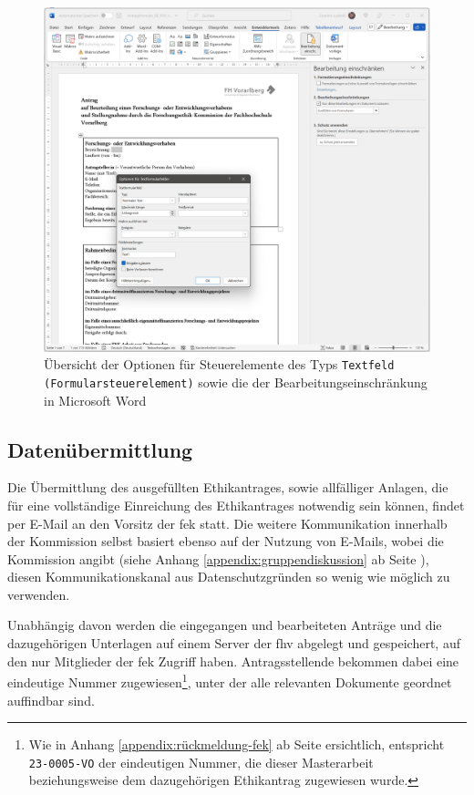 \documentclass[a4paper,12pt,twoside]{scrreprt}
\begin{document}
\begin{figure}[ht]
    \centering
    \includegraphics[width=\linewidth]{thesis/images/Luidold_Word-Vorlage-FHV-Textformularfeld.png}
    \caption{Übersicht der Optionen für Steuerelemente des Typs \texttt{Textfeld (Formularsteuerelement)} sowie die der Bearbeitungseinschränkung in Microsoft Word}
    \label{fig:optionen-textformularfeld-bearbeitungsmöglichkeiten}
\end{figure}

\subsection{Datenübermittlung}
\label{sub-sec:datenübermittlung}

Die Übermittlung des ausgefüllten Ethikantrages, sowie allfälliger Anlagen, die für eine vollständige Einreichung des Ethikantrages notwendig sein können, findet per E-Mail an den Vorsitz der \ac{fek} statt. \cite{fachhochschule_vorarlberg_gmbh_forschungsethik-kommission_2021} Die weitere Kommunikation innerhalb der Kommission selbst basiert ebenso auf der Nutzung von E-Mails, wobei die Kommission angibt (siehe Anhang \ref{appendix:gruppendiskussion} ab Seite \pageref{appendix:gruppendiskussion}), diesen Kommunikationskanal aus Datenschutzgründen so wenig wie möglich zu verwenden.

Unabhängig davon werden die eingegangen und bearbeiteten Anträge und die dazugehörigen Unterlagen auf einem Server der \acl{fhv} abgelegt und gespeichert, auf den nur Mitglieder der \ac{fek} Zugriff haben. Antragsstellende bekommen dabei eine eindeutige Nummer zugewiesen\footnote{Wie in Anhang \ref{appendix:rückmeldung-fek} ab Seite \pageref{appendix:rückmeldung-fek} ersichtlich, entspricht \texttt{23-0005-VO} der eindeutigen Nummer, die dieser Masterarbeit beziehungsweise dem dazugehörigen Ethikantrag zugewiesen wurde.}, unter der alle relevanten Dokumente geordnet auffindbar sind.
\end{document}
